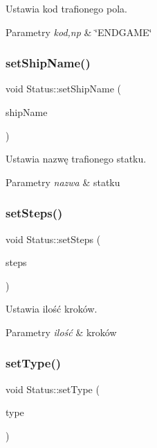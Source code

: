 Ustawia kod trafionego pola. 


\begin{DoxyParams}{Parametry}
{\em kod,np} & \char`\"{}\+E\+N\+D\+G\+A\+M\+E\char`\"{} \\
\hline
\end{DoxyParams}
\mbox{\label{classStatus_a2c5e3f6a4603f9a0165764a2943fd195}} 
\subsubsection{\texorpdfstring{setShipName()}{setShipName()}}
{\footnotesize\ttfamily void Status\+::set\+Ship\+Name (\begin{DoxyParamCaption}\item[{Q\+String}]{ship\+Name }\end{DoxyParamCaption})}



Ustawia nazwę trafionego statku. 


\begin{DoxyParams}{Parametry}
{\em nazwa} & statku \\
\hline
\end{DoxyParams}
\mbox{\label{classStatus_a820bfefd6bcaf99fb6542156d45e987e}} 
\subsubsection{\texorpdfstring{setSteps()}{setSteps()}}
{\footnotesize\ttfamily void Status\+::set\+Steps (\begin{DoxyParamCaption}\item[{int}]{steps }\end{DoxyParamCaption})}



Ustawia ilość kroków. 


\begin{DoxyParams}{Parametry}
{\em ilość} & kroków \\
\hline
\end{DoxyParams}
\mbox{\label{classStatus_ac9174afa375456a797ee823619b90a87}} 
\subsubsection{\texorpdfstring{setType()}{setType()}}
{\footnotesize\ttfamily void Status\+::set\+Type (\begin{DoxyParamCaption}\item[{int}]{type }\end{DoxyParamCaption})}




